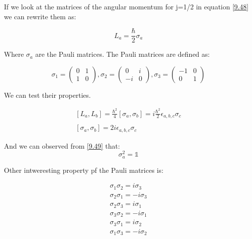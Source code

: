 If we look at the matrices of the angular momentum for j=1/2 in equation \ref{9.48} we can rewrite them as:

\begin{equation}
  L_a =\frac{\hbar}{2} \sigma_a
\end{equation}

Where $\sigma_a$ are the Pauli matrices. The Pauli matrices are defined as:

\begin{equation}
  \sigma_1 = \begin{pmatrix}
    0 & 1 \\
    1 & 0
  \end{pmatrix},
  \sigma_2 = \begin{pmatrix}
    0 & i \\
    -i & 0
  \end{pmatrix},
  \sigma_3 = \begin{pmatrix}
    -1 & 0 \\
    0 & 1
  \end{pmatrix}
\end{equation}

We can test their properties.

\begin{equation}
  \begin{array}{c}
    \left[L_a,L_b\right] = \frac{\hbar^2}{4} \left[\sigma_a,\sigma_b\right] = i\frac{\hbar^2}{2}\epsilon_{a,b,c}\sigma_c
    \\

    \\
    \left[\sigma_a,\sigma_b\right] = 2i \epsilon_{a,b,c}\sigma_c
  \end{array}
\end{equation}

And we can observed from \ref{9.49} that:
\begin{equation}
  \sigma_a^2 = \mathbb{1}
\end{equation}

Other intweresting property pf the Pauli matrices is:

\begin{equation}
  \begin{array}{c}
    \sigma_1 \sigma_2 = i\sigma_3
    \\
    \sigma_2 \sigma_1 = -i\sigma_3
    \\
    \sigma_2 \sigma_3 = i\sigma_1
    \\
    \sigma_3 \sigma_2 = -i\sigma_1
    \\
    \sigma_3 \sigma_1 = i\sigma_2
    \\
    \sigma_1 \sigma_3 = -i\sigma_2
  \end{array}
\end{equation}

